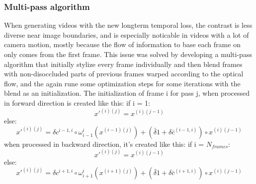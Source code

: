 \subsubsection{Multi-pass algorithm}
When generating videos with the new longterm temporal loss, the contrast is less diverse near image boundaries, and is especially noticable in videos with a lot of camera motion, mostly because the flow of information to base each frame on only comes from the first frame. This issue was solved by developing a multi-pass algorithm that initially stylize every frame individually and then blend frames with non-disoccluded parts of previous frames warped according to the optical flow, and the again rune some optimization steps for some iterations with the blend as an initialization.\newline
The initialization of frame i for pass j, when processed in forward direction is created like this:\newline
if i = 1: 
\begin{equation}
x'^{(i)(j)} = x^{(i)(j-1)}
\end{equation}
else:
\begin{equation}
x'^{(i)(j)} = \delta c^{i-1, i} \circ \omega_{i-1}^i(x^{(i-1)(j)}) + (\bar{\delta}1 + \delta \bar{c}^{(i-1, i)})\circ x^{(i)(j-1)}
\end{equation}\newline
when processed in backward direction, it's created like this:\newline
if i = $N_{frames}$:\newline
\begin{equation}
x'^{(i)(j)} = x^{(i)(j-1)}
\end{equation}
else:\newline
\begin{equation}
x'^{(i)(j)} = \delta c^{i+1, i} \circ \omega_{i+1}^i(x^{(i+1)(j)}) + (\bar{\delta}1 + \delta \bar{c}^{(i+1, i)})\circ x^{(i)(j-1)}
\end{equation}
